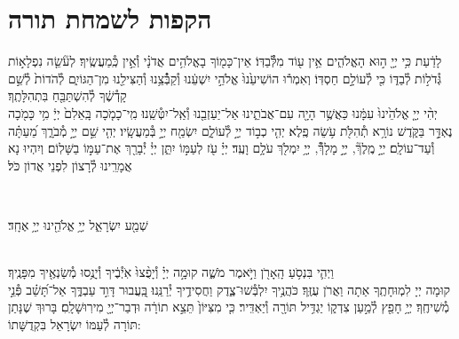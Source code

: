 \documentclass[twoside, openany, parskip=half, 11pt]{book}
\begin{document}
\chapter[הקפות לשמחת תורה]{ הקפות לשמחת תורה }


לָדַ֔עַת כִּ֥י יְיָ֖ ה֣וּא הָאֱלֹהִ֑ים אֵ֥ין ע֖וֹד מִלְּ֯֯בַדּֽוֹ׃ \hfill \break
אֵין־כָּמ֖וֹךָ בָאֱלֹהִ֥ים אֲדֹנָ֗י וְ֯אֵ֣ין כְּֽ֯מַעֲשֶֽׂיךָ׃ \hfill \break
לְעֹ֘שֵׂ֤ה נִפְלָא֣וֹת גְּ֯דֹל֣וֹת לְ֯בַדּ֑וֹ כִּ֖י לְ֯עוֹלָ֣ם חַסְדּֽוֹ׃ \hfill \break
וְאִמְר֕וּ הוֹשִׁיעֵ֙נוּ֙ אֱלֹהֵ֣י יִשְׁעֵ֔נוּ וְ֯קַבְּ֯֯צֵ֥נוּ וְ֯הַצִּילֵ֖נוּ מִן־הַגּוֹיִ֑ם לְ֯הֹדוֹת֙ לְ֯שֵׁ֣ם קָדְ֯שֶׁ֔ךָ לְ֯הִשְׁתַּבֵּ֖חַ בִּתְהִלָּתֶֽךָ׃\\
יְהִ֨י יְיָ֤ אֱלֹהֵ֙ינוּ֙ עִמָּ֔נוּ כַּאֲשֶׁ֥ר הָיָ֖ה עִם־אֲבֹתֵ֑ינוּ אַל־יַעַזְבֵ֖נוּ וְ֯אַֽל־יִטְּ֯שֵֽׁנוּ׃ \hfill \break
מִֽי־כָמֹ֤כָה בָּֽאֵלִם֙ יְיָ֔ מִ֥י כָּמֹ֖כָה נֶאְדָּ֣ר בַּקֹּ֑דֶשׁ נוֹרָ֥א תְ֯הִלֹּ֖ת עֹ֥שֵׂה פֶֽלֶא׃ \hfill \break
יְהִ֤י כְב֣וֹד יְיָ֣ לְ֯עוֹלָ֑ם יִשְׂמַ֖ח יְיָ֣ בְּ֯מַעֲשָֽׂיו׃ \hfill \break
יְהִ֤י שֵׁ֣ם יְיָ֣ מְ֯בֹרָ֑ךְ מֵ֝עַתָּ֗ה וְ֯עַד־עוֹלָֽם׃ \hfill \break
יְיָ֣ מֶֽלֶךְ֘, יְיָ֣ מָלָךְ֯֘, יְיָ֥ יִמְלֹ֖ךְ עֹלָ֥ם וָעֶֽד׃ \hfill \break
יְיָ֗ עֹ֖ז לְעַמּ֣וֹ יִתֵּ֑ן יְיָ֓ יְ֯בָרֵ֖ךְ אֶת־עַמּ֣וֹ בַשָּׁלֽוֹם׃ \hfill \break
וְיִהְיוּ נָא אֲמָרֵֽינוּ לְ֯רָצוֹן לִפְנֵי אֲדוֹן כֹּל׃ \hfill \break

\vspace{-1.3\baselineskip}

\\
\begin{large}
שְׁמַ֖ע יִשְׂרָאֵ֑ל יְיָ֥ אֱלֹהֵ֖ינוּ יְיָ֥ אֶחָֽד׃
\end{large}

\\
וַיְהִ֛י בִּנְסֹ֥עַ הָֽאָרֹ֖ן וַיֹּ֣אמֶר מֹשֶׁ֑ה קוּמָ֣ה יְיָ֗ וְ֯יָפֻ֨צוּ֙ אֹֽיְ֯בֶ֔יךָ וְ֯יָנֻ֥סוּ מְ֯שַׂנְאֶ֖יךָ מִפָּנֶֽיךָ׃\\
קוּמָה יְיָ לִמְוּחָתֶֽךָ אַתָה וַאֲרֹן עֻזֶּֽךָ׃ \hfill \break
כֹּהֲנֶ֥יךָ יִלְבְּ֯שׁוּ־צֶ֑דֶק וַחֲסִידֶ֥יךָ יְ֯רַנֵּֽנוּ׃ \hfill \break
בַּֽ֭עֲבוּר דָּוִ֣ד עַבְדֶּ֑ךָ אַל־תָּ֝שֵׁ֗ב פְּ֯נֵ֣י מְ֯שִׁיחֶֽךָ׃ \hfill \break
יְיָ֥ חָפֵ֖ץ לְ֯מַ֣עַן צִדְק֑וֹ יַגְדִּ֥יל תּוֹרָ֖ה וְ֯יַאְדִּֽיר׃ \hfill \break
כִּ֤י מִצִּיּוֹן֙ תֵּצֵ֣א תוֹרָ֔ה וּדְבַר־יְיָ֖ מִירֽוּשָׁלָֽםִ׃ \hfill \break
בָּרוּךְ שֶׁנָּתַן תּוֹרָה לְ֯עַמּוֹ יִשְׂרָאֵל בִּקְדֻשָּׁתוֹ: \hfill \break
\end{document}
